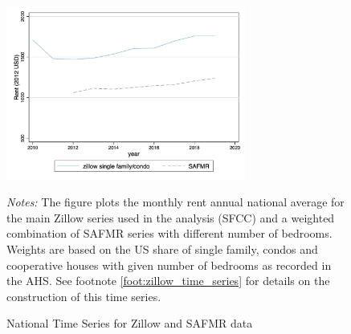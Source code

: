 \begin{figure}[!h]
	\centering
	\caption{National Time Series for Zillow and SAFMR data}
	\label{fig:trend_zillow_safmrwgt}
	\includegraphics[width = 0.7\textwidth]{../../analysis/zillow_benchmark/output/trend_zillow_safmrwgt_zipcode_avg.png}
	\begin{minipage}{0.95\textwidth} \footnotesize
		\vspace{3mm}
		\textit{Notes:} The figure plots the monthly rent annual national average for the main 
		Zillow 	series used in the analysis (SFCC) and a weighted combination of SAFMR series 
		with different number of bedrooms. Weights are based on the US share of single family, 
		condos and cooperative houses with given number of bedrooms as recorded in the AHS. 
		See footnote \ref{foot:zillow_time_series} for details on the construction of this 
		time series.  
	\end{minipage}
\end{figure}

